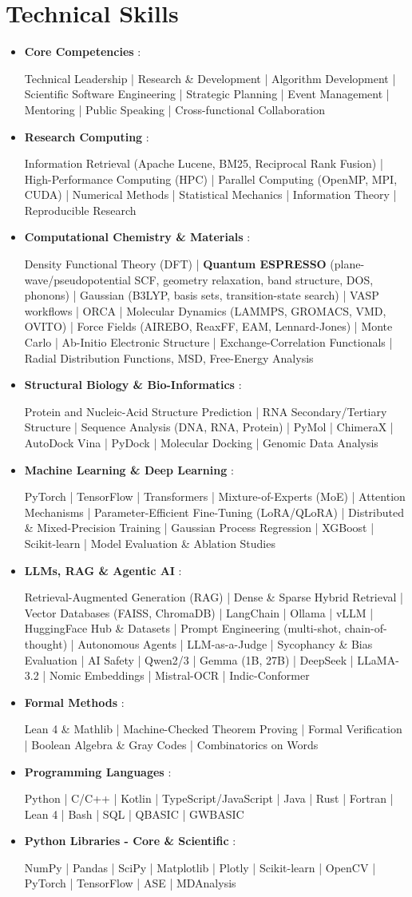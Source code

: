 \documentclass[a4paper,10pt]{article}
\newcommand{\skillBlock}[2]{
    \item \textbf{#1} : 
        \raggedright\small{#2}
    \vspace{-2pt}
}
\newcommand{\compactSection}[2]{
    \section{#1}
    \vspace{-0.1cm}
    #2
    \vspace{-0.2cm}
}
\begin{document}
\compactSection{Technical Skills}{
\begin{itemize}[leftmargin=0.15in,label={},itemsep=2pt]
    \skillBlock{Core Competencies}{Technical Leadership | Research \& Development | Algorithm Development | Scientific Software Engineering | Strategic Planning | Event Management | Mentoring | Public Speaking | Cross-functional Collaboration}
    \skillBlock{Research Computing}{Information Retrieval (Apache Lucene, BM25, Reciprocal Rank Fusion) | High-Performance Computing (HPC) | Parallel Computing (OpenMP, MPI, CUDA) | Numerical Methods | Statistical Mechanics | Information Theory | Reproducible Research}
    \skillBlock{Computational Chemistry \& Materials}{Density Functional Theory (DFT) | \textbf{Quantum ESPRESSO} (plane-wave/pseudopotential SCF, geometry relaxation, band structure, DOS, phonons) | Gaussian (B3LYP, basis sets, transition-state search) | VASP workflows | ORCA | Molecular Dynamics (LAMMPS, GROMACS, VMD, OVITO) | Force Fields (AIREBO, ReaxFF, EAM, Lennard-Jones) | Monte Carlo | Ab-Initio Electronic Structure | Exchange-Correlation Functionals | Radial Distribution Functions, MSD, Free-Energy Analysis}
    \skillBlock{Structural Biology \& Bio-Informatics}{Protein and Nucleic-Acid Structure Prediction | RNA Secondary/Tertiary Structure | Sequence Analysis (DNA, RNA, Protein) | PyMol | ChimeraX | AutoDock Vina | PyDock | Molecular Docking | Genomic Data Analysis}
    \skillBlock{Machine Learning \& Deep Learning}{PyTorch | TensorFlow | Transformers | Mixture-of-Experts (MoE) | Attention Mechanisms | Parameter-Efficient Fine-Tuning (LoRA/QLoRA) | Distributed \& Mixed-Precision Training | Gaussian Process Regression | XGBoost | Scikit-learn | Model Evaluation \& Ablation Studies}
    \skillBlock{LLMs, RAG \& Agentic AI}{Retrieval-Augmented Generation (RAG) | Dense \& Sparse Hybrid Retrieval | Vector Databases (FAISS, ChromaDB) | LangChain | Ollama | vLLM | HuggingFace Hub \& Datasets | Prompt Engineering (multi-shot, chain-of-thought) | Autonomous Agents | LLM-as-a-Judge | Sycophancy \& Bias Evaluation | AI Safety | Qwen2/3 | Gemma (1B, 27B) | DeepSeek | LLaMA-3.2 | Nomic Embeddings | Mistral-OCR | Indic-Conformer}
    \skillBlock{Formal Methods}{Lean 4 \& Mathlib | Machine-Checked Theorem Proving | Formal Verification | Boolean Algebra \& Gray Codes | Combinatorics on Words}
    \skillBlock{Programming Languages}{Python | C/C++ | Kotlin | TypeScript/JavaScript | Java | Rust | Fortran | Lean 4 | Bash | SQL | QBASIC | GWBASIC}
    \skillBlock{Python Libraries - Core \& Scientific}{NumPy | Pandas | SciPy | Matplotlib | Plotly | Scikit-learn | OpenCV | PyTorch | TensorFlow | ASE | MDAnalysis}

\end{itemize}}
\end{document}
